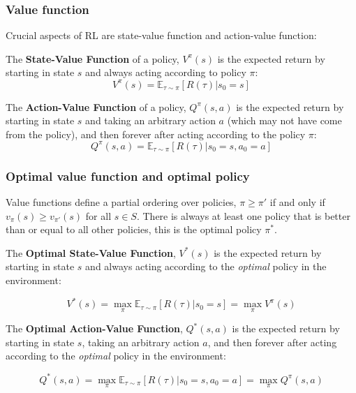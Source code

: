 \documentclass[9pt]{beamer}
\newcommand{\E}{{\mathbb E}}
\begin{document}
\begin{frame}

	\frametitle{Value function}

		Crucial aspects of RL are state-value function and action-value function:

		\begin{definition}
			The \textbf{State-Value Function} of a policy, $V^{\pi}(s)$ is the expected return by starting in state $s$ and always acting according to policy $\pi$:
			\begin{equation}
				V^{\pi}(s) = \E_{\tau \sim \pi} [R(\tau)| s_0 = s]
			\end{equation}
		\end{definition}

		\begin{definition}
			The \textbf{Action-Value Function} of a policy, $Q^{\pi}(s,a)$ is the expected return by starting in state $s$ and taking an arbitrary action $a$ (which may not have come from the policy), and then forever after acting according to the policy $\pi$:
			\begin{equation}
					Q^{\pi}(s,a) = \E_{\tau \sim \pi}[R(\tau)| s_0 = s, a_0 = a]	
			\end{equation}
			
		\end{definition}
	
\end{frame}





\begin{frame}
	\frametitle{Optimal value function and optimal policy }
	Value functions define a partial ordering over policies,
	$\pi \geq \pi'$ if and only if $v_\pi(s) \geq v_{\pi'}(s)$ for all $s \in S$. There is always at least one policy that is better than or equal to all other policies, this is the optimal policy $\pi^*$.

	\begin{definition}
		The \textbf{Optimal State-Value Function}, $V^*(s)$ is the expected return by starting in state $s$ and always acting according to the \textit{optimal} policy in the environment:
		
		\begin{equation}
			V^{*}(s) = \max_\pi \E_{\tau \sim \pi} [R(\tau)| s_0 = s] = \max_\pi V^\pi(s)
		\end{equation}
	\end{definition}

	\begin{definition}
		The \textbf{Optimal Action-Value Function}, $Q^*(s,a)$ is the expected return by starting in state $s$, taking an arbitrary action $a$, and then forever after acting according to the \textit{optimal} policy in the environment:
		
		\begin{equation}
		Q^*(s,a) = \max_{\pi} \E_{\tau \sim \pi}{[R(\tau)| s_0 = s, a_0 = a]} = \max_\pi Q^\pi(s,a)
		\end{equation}
	\end{definition}

\end{frame}
\end{document}
